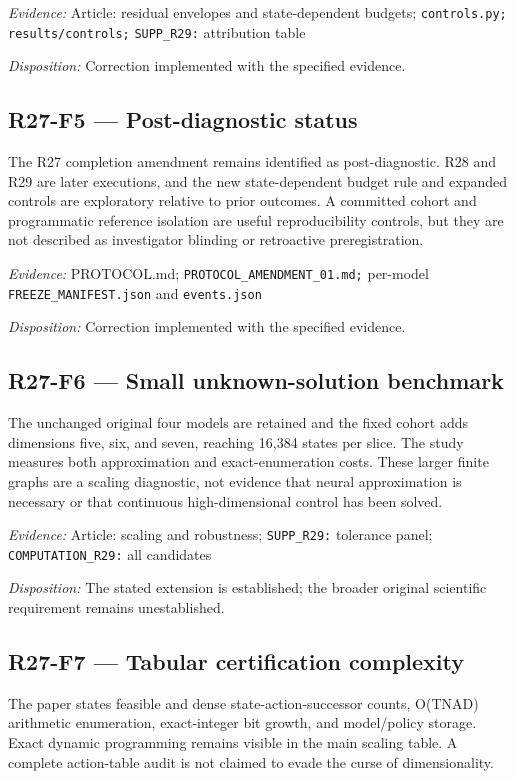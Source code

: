 \emph{Evidence:} Article: residual envelopes and state-dependent budgets; \nolinkurl{controls.py;} \nolinkurl{results/controls;} \nolinkurl{SUPP_R29:} attribution table

\emph{Disposition:} Correction implemented with the specified evidence.
\subsection{R27-F5 --- Post-diagnostic status}
The R27 completion amendment remains identified as post-diagnostic. R28 and R29 are later executions, and the new state-dependent budget rule and expanded controls are exploratory relative to prior outcomes. A committed cohort and programmatic reference isolation are useful reproducibility controls, but they are not described as investigator blinding or retroactive preregistration.

\emph{Evidence:} PROTOCOL.md; \nolinkurl{PROTOCOL_AMENDMENT_01.md;} per-model \nolinkurl{FREEZE_MANIFEST.json} and \nolinkurl{events.json}

\emph{Disposition:} Correction implemented with the specified evidence.
\subsection{R27-F6 --- Small unknown-solution benchmark}
The unchanged original four models are retained and the fixed cohort adds dimensions five, six, and seven, reaching 16,384 states per slice. The study measures both approximation and exact-enumeration costs. These larger finite graphs are a scaling diagnostic, not evidence that neural approximation is necessary or that continuous high-dimensional control has been solved.

\emph{Evidence:} Article: scaling and robustness; \nolinkurl{SUPP_R29:} tolerance panel; \nolinkurl{COMPUTATION_R29:} all candidates

\emph{Disposition:} The stated extension is established; the broader original scientific requirement remains unestablished.
\subsection{R27-F7 --- Tabular certification complexity}
The paper states feasible and dense state-action-successor counts, O(TNAD) arithmetic enumeration, exact-integer bit growth, and model/policy storage. Exact dynamic programming remains visible in the main scaling table. A complete action-table audit is not claimed to evade the curse of dimensionality.

